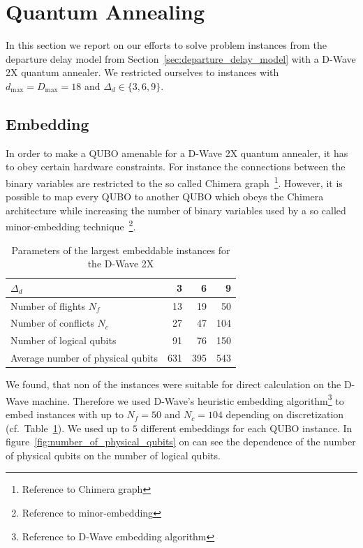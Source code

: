 \section{Quantum Annealing}
In this section we report on our efforts to solve problem instances from the departure delay model from Section~\ref{sec:departure_delay_model} with a D-Wave 2X quantum annealer.
We restricted ourselves to instances with $d_\text{max}=D_\text{max}=18$ and $\Delta_d \in \{3, 6, 9\}$.
\subsection{Embedding}
In order to make a QUBO amenable for a D-Wave 2X quantum annealer, it has to obey certain hardware constraints.
For instance the connections between the binary variables are restricted to the so called Chimera graph~\footnote{Reference to Chimera graph}.
However, it is possible to map every QUBO to another QUBO which obeys the Chimera architecture while increasing the number of binary variables used by a so called minor-embedding technique~\footnote{Reference to minor-embedding}. 

\begin{table}[htpb]
    \begin{tabular}{lrrr}
    \toprule
    $\Delta_d$ &    3 &    6 &    9 \\
    \midrule
    Number of flights $N_f$   &   13 &   19 &   50 \\
    Number of conflicts $N_c$ &   27 &   47 &  104 \\
    Number of logical qubits  &   91 &   76 &  150 \\
    Average number of physical qubits &  631 &  395 &  543 \\
    \bottomrule
    \end{tabular}
    \caption{Parameters of the largest embeddable instances for the D-Wave 2X}
\label{tab:embedding}
\end{table}

We found, that non of the instances were suitable for direct calculation on the D-Wave machine.
Therefore we used D-Wave's heuristic embedding algorithm\footnote{Reference to D-Wave embedding algorithm} to embed instances with up to $N_f=50$ and $N_c=104$ depending on discretization (cf.\ Table~\ref{tab:embedding}).
We used up to $5$ different embeddings for each QUBO instance.
In figure~\ref{fig:number_of_physical_qubits} on can see the dependence of the number of physical qubits on the number of logical qubits.


